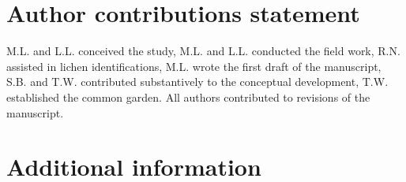 \documentclass[fleqn,10pt]{wlscirep}
\begin{document}
\section*{Author contributions statement}

M.L. and L.L. conceived the study, M.L. and L.L. conducted the field
work, R.N.  assisted in lichen identifications, M.L. wrote the first
draft of the manuscript, S.B. and T.W. contributed substantively to
the conceptual development, T.W. established the common garden. All
authors contributed to revisions of the manuscript.

\section*{Additional information}




\clearpage
\newpage
\end{document}
